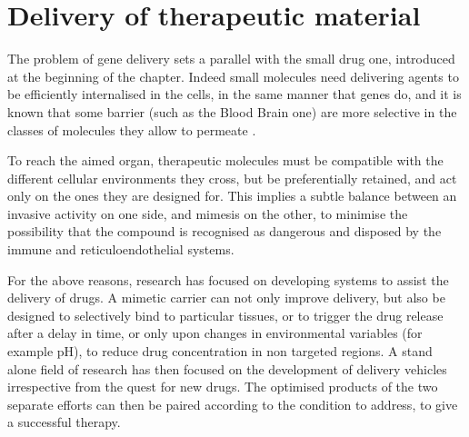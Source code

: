 \section{Delivery of therapeutic material}
The problem of gene delivery sets a parallel with the small drug one, introduced at the beginning of the chapter. Indeed small molecules need delivering agents to be efficiently internalised in the cells, in the same manner that genes do, and it is known that some barrier (such as the Blood Brain one) are more selective in the classes of molecules they allow to permeate \citep{Pattni2015, Krol2012}.

To reach the aimed organ, therapeutic molecules must be compatible with the different cellular environments they cross, but be preferentially retained, and act only on the ones they are designed for. This implies a subtle balance between an invasive activity on one side, and mimesis on the other, to minimise the possibility that the compound is recognised as dangerous and disposed by the immune and reticuloendothelial systems.


For the above reasons, research has focused on developing systems to assist the delivery of drugs. A mimetic carrier can not only improve delivery, but also be designed to selectively bind to particular tissues, or to trigger the drug release after a delay in time, or only upon changes in environmental variables (for example pH), to reduce drug concentration in non targeted regions. A stand alone field of research has then focused on the development of delivery vehicles irrespective from the quest for new drugs. The optimised products of the two separate efforts can then be paired according to the condition to address, to give a successful therapy.

